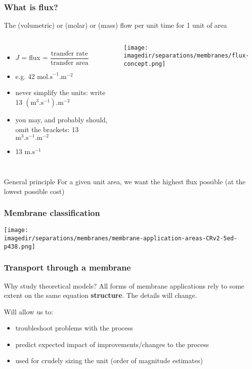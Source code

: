 \begin{frame}\frametitle{What is flux?}
	\begin{exampleblock}{}
		\centering
		\small The (volumetric) or (molar) or (mass) flow per unit time for 1 unit of area
	\end{exampleblock}
	\vspace{12pt}
	\begin{columns}[t]
			\begin{itemize}
				\item	$J$ = flux = $\dfrac{\text{transfer rate}}{\text{transfer area}}$
				\item	e.g. 42 $\text{mol.s}^{-1}\text{.m}^{-2}$
				\item	never simplify the units: write 13 $\left(\text{m}^3.\text{s}^{-1}\right)\text{.m}^{-2}$
				\item	you may, and probably should, omit the brackets: 13 $\text{m}^3.\text{s}^{-1}\text{.m}^{-2}$
				\item	{\color{myRed}{do not write}} 13 $\text{m}\text{.s}^{-1}$
			\end{itemize}
			\begin{center}
				\texttt{[image: \\imagedir/separations/membranes/flux-concept.png]}
			\end{center}
	\end{columns}
	\begin{exampleblock}{General principle}
		For a given unit area, we want the highest flux possible (at the lowest possible cost)
	\end{exampleblock}
\end{frame}

\begin{frame}\frametitle{Membrane classification}

	\begin{center}
		\texttt{[image: \\imagedir/separations/membranes/membrane-application-areas-CRv2-5ed-p438.png]}
	\end{center}

\end{frame}

\begin{frame}\frametitle{Transport through a membrane}
	\begin{exampleblock}{Why study theoretical models?}
		All forms of membrane applications rely to some extent on the same equation \textbf{structure}. The details will change.
	\end{exampleblock}

	\vspace{12pt}

	Will allow us to:
	\begin{itemize}
		\item	troubleshoot problems with the process
		\item	predict expected impact of improvements/changes to the process
		\item	used for crudely sizing the unit (order of magnitude estimates)
	\end{itemize}

\end{frame}

